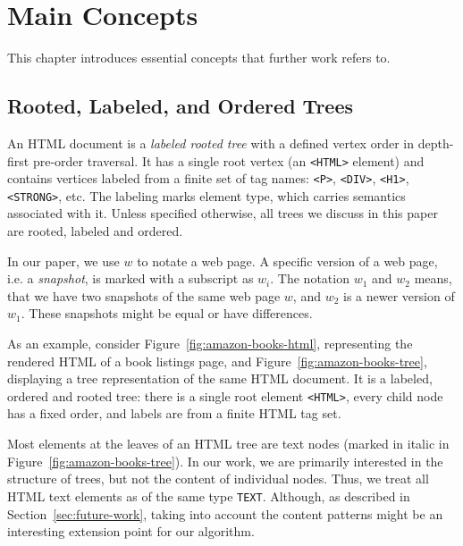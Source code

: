 \chapter{Main Concepts}
\label{ch:concepts}

This chapter introduces essential concepts that further work refers to.


\section{Rooted, Labeled, and Ordered Trees}

An HTML document is a \emph{labeled rooted tree} with a defined vertex order in depth-first pre-order traversal. It has a single root vertex (an \texttt{<HTML>} element) and contains vertices labeled from a finite set of tag names: \texttt{<P>}, \texttt{<DIV>}, \texttt{<H1>}, \texttt{<STRONG>}, etc. The labeling marks element type, which carries semantics associated with it. Unless specified otherwise, all trees we discuss in this paper are rooted, labeled and ordered.

In our paper, we use $w$ to notate a web page. A specific version of a web page, i.e. a \emph{snapshot}, is marked with a subscript as $w_i$. The notation $w_1$ and $w_2$ means, that we have two snapshots of the same web page $w$, and $w_2$ is a newer version of $w_1$. These snapshots might be equal or have differences.

As an example, consider Figure~\ref{fig:amazon-books-html}, representing the rendered HTML of a book listings page, and Figure~\ref{fig:amazon-books-tree}, displaying a tree representation of the same HTML document. It is a labeled, ordered and rooted tree: there is a single root element \texttt{<HTML>}, every child node has a fixed order, and labels are from a finite HTML tag set.

Most elements at the leaves of an HTML tree are text nodes (marked in italic in Figure~\ref{fig:amazon-books-tree}). In our work, we are primarily interested in the structure of trees, but not the content of individual nodes. Thus, we treat all HTML text elements as of the same type \texttt{TEXT}. Although, as described in Section~\ref{sec:future-work}, taking into account the content patterns might be an interesting extension point for our algorithm.

